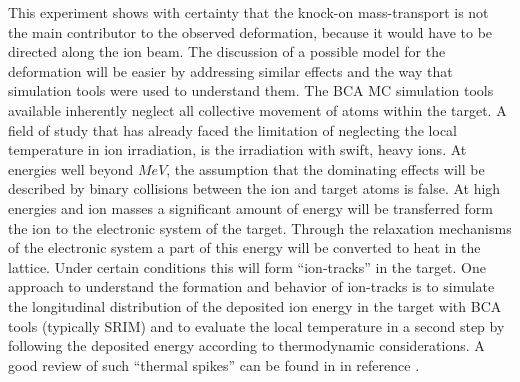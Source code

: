 This experiment shows with certainty that the knock-on mass-transport is not the main contributor to the observed deformation, because it would have to be directed along the ion beam. The discussion of a possible model for the deformation will be easier by addressing similar effects and the way that simulation tools were used to understand them. The BCA MC simulation tools available inherently neglect all collective movement of atoms within the target. A field of study that has already faced the limitation of neglecting the local temperature in ion irradiation, is the irradiation with swift, heavy ions. At energies well beyond $MeV$, the assumption that the dominating effects will be described by binary collisions between the ion and target atoms is false. At high energies and ion masses a significant amount of energy will be transferred form the ion to the electronic system of the target. Through the relaxation mechanisms of the electronic system a part of this energy will be converted to heat in the lattice. Under certain conditions this will form ``ion-tracks'' in the target. One approach to understand the formation and behavior of ion-tracks is to simulate the longitudinal distribution of the deposited ion energy in the target with BCA tools (typically SRIM) and to evaluate the local temperature in a second step by following the deposited energy according to thermodynamic considerations. A good review of such ``thermal spikes'' can be found in in reference \cite{wesch_effect_2004}. 

